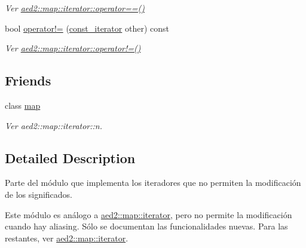 \begin{DoxyCompactItemize}
\begin{DoxyCompactList}\small\item\em \-Ver \hyperlink{classaed2_1_1map_1_1iterator_ad052c1ef8477a1613c292202226053a5}{aed2\-::map\-::iterator\-::operator==()} \end{DoxyCompactList}\item 
\hypertarget{classaed2_1_1iterator_1_1const__iterator_aab85ac017cb4e8404fe243691b8c867f}{bool \hyperlink{classaed2_1_1iterator_1_1const__iterator_aab85ac017cb4e8404fe243691b8c867f}{operator!=} (\hyperlink{classaed2_1_1iterator_1_1const__iterator}{const\-\_\-iterator} other) const }\label{classaed2_1_1iterator_1_1const__iterator_aab85ac017cb4e8404fe243691b8c867f}

\begin{DoxyCompactList}\small\item\em \-Ver \hyperlink{classaed2_1_1map_1_1iterator_a836c7a166d63f507c4f79085ae953c51}{aed2\-::map\-::iterator\-::operator!=()} \end{DoxyCompactList}\end{DoxyCompactItemize}
\subsection*{\-Friends}
\begin{DoxyCompactItemize}
\item 
\hypertarget{classaed2_1_1iterator_1_1const__iterator_aeda338414e516b47761f994fb78056c6}{class \hyperlink{classaed2_1_1iterator_1_1const__iterator_aeda338414e516b47761f994fb78056c6}{map}}\label{classaed2_1_1iterator_1_1const__iterator_aeda338414e516b47761f994fb78056c6}

\begin{DoxyCompactList}\small\item\em \-Ver aed2\-::map\-::iterator\-::n. \end{DoxyCompactList}\end{DoxyCompactItemize}


\subsection{\-Detailed \-Description}
\-Parte del módulo que implementa los iteradores que no permiten la modificación de los significados. 

\-Este módulo es análogo a \hyperlink{classaed2_1_1map_1_1iterator}{aed2\-::map\-::iterator}, pero no permite la modificación cuando hay aliasing. \-Sólo se documentan las funcionalidades nuevas. \-Para las restantes, ver \hyperlink{classaed2_1_1map_1_1iterator}{aed2\-::map\-::iterator}. 

